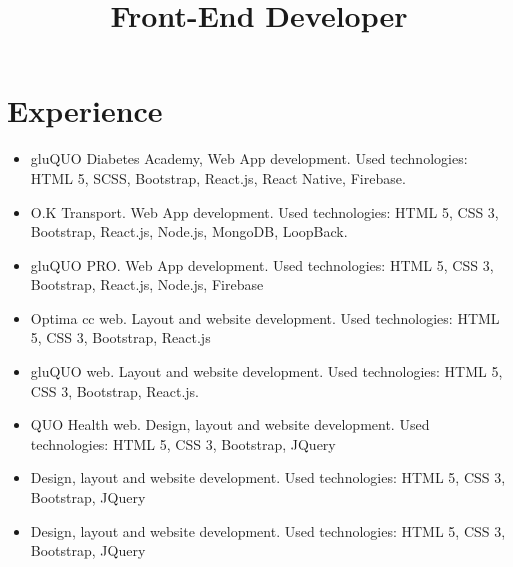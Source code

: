 \documentclass[11pt,a4paper]{moderncv}
\title{Front-End Developer}
\begin{document}
    \maketitle
    \section{Experience}
    {\begin{itemize}
         \item gluQUO Diabetes Academy, Web App development. Used technologies: HTML 5, SCSS, Bootstrap, React.js, React Native, Firebase.
         \item O.K Transport. Web App development. Used technologies: HTML 5, CSS 3, Bootstrap, React.js, Node.js, MongoDB, LoopBack.
         \item gluQUO PRO. Web App development. Used technologies: HTML 5, CSS 3, Bootstrap, React.js, Node.js, Firebase
         \item Optima cc web. Layout and website development. Used technologies: HTML 5, CSS 3, Bootstrap, React.js
         \item gluQUO web. Layout and website development. Used technologies: HTML 5, CSS 3, Bootstrap, React.js.
         \item QUO Health web. Design, layout and website development. Used technologies: HTML 5, CSS 3, Bootstrap, JQuery
    \end{itemize}
    }
    {
    \begin{itemize}
        \item Design, layout and website development. Used technologies: HTML 5, CSS 3, Bootstrap, JQuery
    \end{itemize}
    \begin{itemize}
        \item Design, layout and website development. Used technologies: HTML 5, CSS 3, Bootstrap, JQuery
    \end{itemize}
    }
\end{document}
